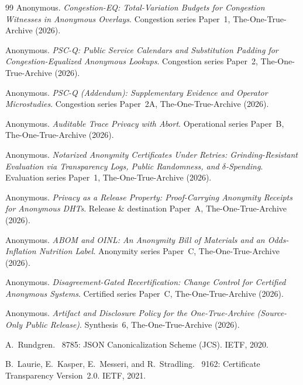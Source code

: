 \documentclass[11pt]{article}
\begin{document}
\begin{thebibliography}{99}\small
{}
Anonymous.
\newblock \emph{Congestion-EQ: Total-Variation Budgets for Congestion Witnesses in Anonymous Overlays}.
\newblock Congestion series Paper~1, The-One-True-Archive (2026).

Anonymous.
\newblock \emph{PSC-Q: Public Service Calendars and Substitution Padding for Congestion-Equalized Anonymous Lookups}.
\newblock Congestion series Paper~2, The-One-True-Archive (2026).

Anonymous.
\newblock \emph{PSC-Q (Addendum): Supplementary Evidence and Operator Microstudies}.
\newblock Congestion series Paper~2A, The-One-True-Archive (2026).

Anonymous.
\newblock \emph{Auditable Trace Privacy with Abort}.
\newblock Operational series Paper~B, The-One-True-Archive (2026).

Anonymous.
\newblock \emph{Notarized Anonymity Certificates Under Retries: Grinding-Resistant Evaluation via Transparency Logs, Public Randomness, and $\delta$-Spending}.
\newblock Evaluation series Paper~1, The-One-True-Archive (2026).

Anonymous.
\newblock \emph{Privacy as a Release Property: Proof-Carrying Anonymity Receipts for Anonymous DHTs}.
\newblock Release \& destination Paper~A, The-One-True-Archive (2026).

Anonymous.
\newblock \emph{ABOM and OINL: An Anonymity Bill of Materials and an Odds-Inflation Nutrition Label}.
\newblock Anonymity series Paper~C, The-One-True-Archive (2026).

Anonymous.
\newblock \emph{Disagreement-Gated Recertification: Change Control for Certified Anonymous Systems}.
\newblock Certified series Paper~C, The-One-True-Archive (2026).

Anonymous.
\newblock \emph{Artifact and Disclosure Policy for the One-True-Archive (Source-Only Public Release)}.
\newblock Synthesis~6, The-One-True-Archive (2026).

A.~Rundgren.
~8785: {JSON} Canonicalization Scheme ({JCS}).
\newblock IETF, 2020.

B.~Laurie, E.~Kasper, E.~Messeri, and R.~Stradling.
~9162: Certificate Transparency Version~2.0.
\newblock IETF, 2021.


\end{thebibliography}
\end{document}
